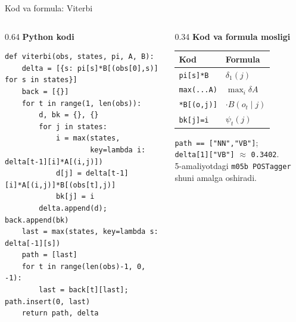 \documentclass[aspectratio=169,11pt]{beamer}
\begin{document}
\begin{frame}[fragile]{Kod va formula: Viterbi}
\scriptsize

\begin{columns}[T,totalwidth=\textwidth]
\begin{column}{0.64\textwidth}
\textbf{Python kodi}

\begin{tcolorbox}[defbox,left=2mm,right=2mm,top=1mm,bottom=1mm]
\begin{verbatim}
def viterbi(obs, states, pi, A, B):
    delta = [{s: pi[s]*B[(obs[0],s)] for s in states}]
    back = [{}]
    for t in range(1, len(obs)):
        d, bk = {}, {}
        for j in states:
            i = max(states,
                    key=lambda i: delta[t-1][i]*A[(i,j)])
            d[j] = delta[t-1][i]*A[(i,j)]*B[(obs[t],j)]
            bk[j] = i
        delta.append(d); back.append(bk)
    last = max(states, key=lambda s: delta[-1][s])
    path = [last]
    for t in range(len(obs)-1, 0, -1):
        last = back[t][last]; path.insert(0, last)
    return path, delta
\end{verbatim}
\end{tcolorbox}
\end{column}

\begin{column}{0.34\textwidth}
\textbf{Kod va formula mosligi}

\begin{tabular}{@{}l l@{}}
\toprule
\textbf{Kod} & \textbf{Formula} \\
\midrule
\texttt{pi[s]*B}    & $\delta_1(j)$ \\
\texttt{max(...A)}  & $\max_i \delta A$ \\
\texttt{*B[(o,j)]}  & $\cdot B(o_t\mid j)$ \\
\texttt{bk[j]=i}    & $\psi_t(j)$ \\
\bottomrule
\end{tabular}

\vspace{5pt}
\begin{tcolorbox}[defbox,left=2mm,right=2mm,top=1mm,bottom=1mm]
\scriptsize
\texttt{path == ["NN","VB"]};\\
\texttt{delta[1]["VB"]} $\approx$ \texttt{0.3402}.\\
5-amaliyotdagi \texttt{m05b POSTagger} shuni amalga oshiradi.
\end{tcolorbox}
\end{column}
\end{columns}

\end{frame}
\end{document}
